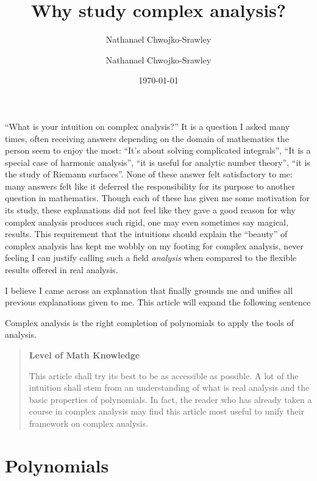 \documentclass{article}
\title{Why study complex analysis?}
\author{Nathanael Chwojko-Srawley}
\date{\today}
\author{Nathanael Chwojko-Srawley}
\renewcommand{\maketitle}{
    \quad
    \vspace{1em}
  \begin{center}
      \LARGE\bfseries \thetitle \par
      \vspace{0.6em}
      \large
  \end{center}
    \vspace{1em}
}
\newenvironment{titledBox}[1]
 {\begin{tcolorbox}[enhanced, sharp corners, colback=white , borderline={0.2pt}{0pt}{black}]
   \begin{quote}\textbf{#1}
   }{
   \end{quote}\end{tcolorbox}}
\begin{document}
\maketitle

``What is your intuition on complex analysis?'' It is a question I asked many times, often receiving answers
depending on the domain of mathematics the person seem to enjoy the most: ``It's about solving complicated
integrals'', ``It is a special case of harmonic analysis'', ``it is useful for analytic number theory'', ``it
is the study of Riemann surfaces''. None of these answer felt satisfactory to me: many answers felt like it
deferred the responsibility for its purpose to another question in mathematics. Though each of these has given me
some motivation for its study, these explanations did not feel like they gave a good reason for why complex
analysis produces such rigid, one may even sometimes say magical, results. This requirement that the
intuitions should explain the ``beauty'' of complex analysis has kept me wobbly on my footing for complex
analysis, never feeling I can justify calling such a field \emph{analysis} when compared to the flexible
results offered in real analysis.

I believe I came across an explanation that finally grounds me and unifies all previous explanations given to
me. This article will expand the following sentence
\begin{center}
  \addtolength{\leftskip}{2cm}  %
\addtolength{\rightskip}{2cm} %
  Complex analysis is the right completion of polynomials to apply the tools of analysis.
\end{center}

\begin{titledBox}{Level of Math Knowledge}
  This article shall try its best to be as accessible as possible. A lot of the intuition shall stem
  from an understanding of what is real analysis and the basic properties of polynomials. In fact, the reader
  who has already taken a course in complex analysis may find this article most useful to unify their
  framework on complex analysis.
\end{titledBox}

\section{Polynomials}
\end{document}
